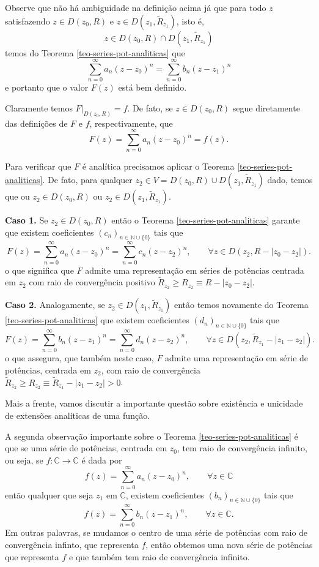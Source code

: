 Observe que não há ambiguidade na definição acima já que para 
todo $z$ satisfazendo $z\in D(z_0,R)$ e $z\in D(z_1,\widetilde{R}_{z_1})$, isto é, 
\[
z\in D(z_0,R)\cap D(z_1,\widetilde{R}_{z_1})
\] 
temos do Teorema \ref{teo-series-pot-analiticas} que
\[
\sum_{n=0}^{\infty}a_n(z-z_0)^n
=
\sum_{n=0}^{\infty}b_n(z-z_1)^n
\]
e portanto que o valor $F(z)$ está bem definido. 

\medskip 
Claramente temos $F|_{D(z_0,R)} = f$. De fato, se $z\in D(z_0,R)$ segue diretamente das
definições de $F$ e $f$, respectivamente, que 
\[
F(z) = \sum_{n=0}^{\infty}a_n(z-z_0)^n = f(z).
\]

Para verificar que $F$ é analítica precisamos aplicar o 
Teorema \ref{teo-series-pot-analiticas}. 
De fato, para qualquer $z_2\in V= D(z_0,R)\cup D(z_1,\widetilde{R}_{z_1})$ dado,
temos que ou $z_2\in D(z_0,R)$ ou $z_2\in D(z_1,\widetilde{R}_{z_1})$.

\medskip
\noindent
\textbf{Caso 1.} Se $z_2\in D(z_0,R)$ 
então o Teorema \ref{teo-series-pot-analiticas} garante
que existem coeficientes $(c_n)_{n\in\mathbb{N}\cup\{0\}}$ tais que 
\[
F(z) 
= 
\sum_{n=0}^{\infty}a_n(z-z_0)^n 
= 
\sum_{n=0}^{\infty}c_n(z-z_2)^n, \qquad \forall z\in D(z_2,R-|z_0-z_2|).
\]
o que significa que $F$ admite uma representação em séries de potências
centrada em $z_2$ com raio de convergência positivo 
$\widetilde{R}_{z_2} \geqslant R_{z_2}\equiv R-|z_0-z_2|$.

\medskip
\noindent
\textbf{Caso 2.}
Analogamente, se $z_2\in D(z_1,\widetilde{R}_{z_1})$ então temos novamente 
do Teorema \ref{teo-series-pot-analiticas} que existem coeficientes 
$(d_n)_{n\in\mathbb{N}\cup\{0\}}$ tais que 
\[
F(z) 
= 
\sum_{n=0}^{\infty}b_n(z-z_1)^n  
= 
\sum_{n=0}^{\infty}d_n(z-z_2)^n, \qquad \forall z\in D(z_2,\widetilde{R}_{z_1}-|z_1-z_2|).
\]
o que assegura, que também neste caso, $F$ admite uma representação em série
de potências, centrada em $z_2$, com raio de convergência 
$\widetilde{R}_{z_2}\geqslant R_{z_2}\equiv \widetilde{R}_{z_1}-|z_1-z_2|>0$.

\medskip 

Mais a frente, vamos discutir a importante questão 
sobre existência e unicidade de extensões analíticas de uma função.

\medskip


A segunda observação importante sobre o Teorema \ref{teo-series-pot-analiticas}
é que se uma série de potências, centrada em $z_0$, 
tem raio de convergência infinito, ou seja,
se $f:\mathbb{C}\to\mathbb{C}$ é dada por 
\[
f(z) = \sum_{n=0}^{\infty} a_n(z-z_0)^n,\qquad \forall z\in\mathbb{C}
\]
então qualquer que seja $z_1$ em $\mathbb{C}$, existem coeficientes 
$(b_n)_{n\in\mathbb{N}\cup\{0\}}$ tais que 
\[
f(z) = \sum_{n=0}^{\infty} b_n(z-z_1)^n, \qquad \forall z\in\mathbb{C}.
\]
Em outras palavras, se mudamos o centro de uma série de potências 
com raio de convergência infinto, que representa $f$, 
então obtemos uma nova série de potências que representa $f$
e que também tem raio de convergência infinito.


